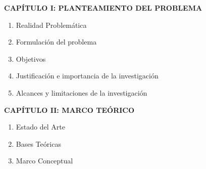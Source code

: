 \fontsize{10}{9}\selectfont








\textbf{CAPÍTULO I: PLANTEAMIENTO DEL PROBLEMA}
\begin{enumerate}[label=1.\arabic*]
    \item Realidad Problemática
    \item Formulación del problema
    \item Objetivos
    \item Justificación e importancia de la investigación
    \item Alcances y limitaciones de la investigación
\end{enumerate}


\textbf{CAPÍTULO II: MARCO TEÓRICO}
\begin{enumerate}[label=2.\arabic*]
    \item Estado del Arte
    \item Bases Teóricas
    \item Marco Conceptual
\end{enumerate}

